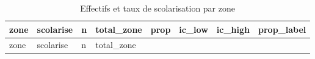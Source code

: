\documentclass[
  11pt,
]{article}
\begin{document}
\begin{longtable}[]{@{}
  >{\raggedright\arraybackslash}p{}
  >{\raggedright\arraybackslash}p{}
  >{\raggedleft\arraybackslash}p{}
  >{\raggedleft\arraybackslash}p{}
  >{\raggedleft\arraybackslash}p{}
  >{\raggedleft\arraybackslash}p{}
  >{\raggedleft\arraybackslash}p{}
  >{\raggedright\arraybackslash}p{}@{}}
\caption{Effectifs et taux de scolarisation par zone}\tabularnewline
\toprule\noalign{}
\begin{minipage}[b]{\linewidth}\raggedright
zone
\end{minipage} & \begin{minipage}[b]{\linewidth}\raggedright
scolarise
\end{minipage} & \begin{minipage}[b]{\linewidth}\raggedleft
n
\end{minipage} & \begin{minipage}[b]{\linewidth}\raggedleft
total\_zone
\end{minipage} & \begin{minipage}[b]{\linewidth}\raggedleft
prop
\end{minipage} & \begin{minipage}[b]{\linewidth}\raggedleft
ic\_low
\end{minipage} & \begin{minipage}[b]{\linewidth}\raggedleft
ic\_high
\end{minipage} & \begin{minipage}[b]{\linewidth}\raggedright
prop\_label
\end{minipage} \\
\midrule\noalign{}
\endfirsthead
\toprule\noalign{}
\begin{minipage}[b]{\linewidth}\raggedright
zone
\end{minipage} & \begin{minipage}[b]{\linewidth}\raggedright
scolarise
\end{minipage} & \begin{minipage}[b]{\linewidth}\raggedleft
n
\end{minipage} & \begin{minipage}[b]{\linewidth}\raggedleft
total\_zone
\end{minipage} & \begin{minipage}[b]{\linewidth}\raggedleft

\end{minipage}
\end{longtable}
\end{document}
